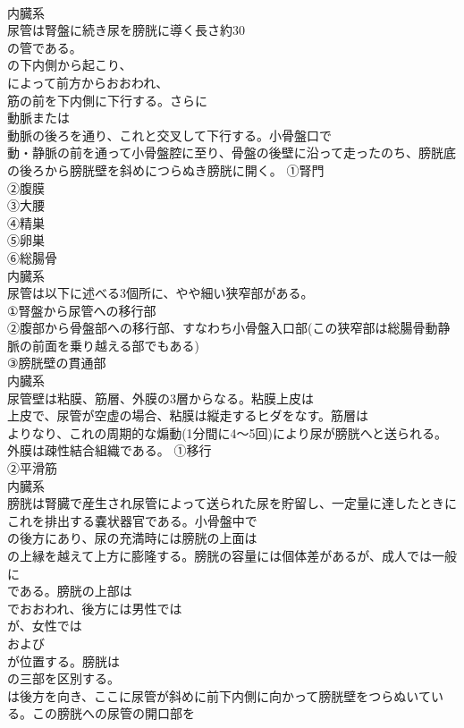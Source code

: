 \documentclass[8pt]{extreport}
\begin{document}
\begin{CJK}{UTF8}{min}
\\	内臓系
\\	尿管は腎盤に続き尿を膀胱に導く長さ約30
\\	の管である。
\\	の下内側から起こり、
\\	によって前方からおおわれ、
\\	筋の前を下内側に下行する。さらに
\\	動脈または
\\	動脈の後ろを通り、これと交叉して下行する。小骨盤口で
\\	動・静脈の前を通って小骨盤腔に至り、骨盤の後壁に沿って走ったのち、膀胱底の後ろから膀胱壁を斜めにつらぬき膀胱に開く。	①腎門
\\	②腹膜
\\	③大腰
\\	④精巣
\\	⑤卵巣
\\	⑥総腸骨
\\	内臓系
\\	尿管は以下に述べる3個所に、やや細い狭窄部がある。
\\	①腎盤から尿管への移行部
\\	②腹部から骨盤部への移行部、すなわち小骨盤入口部(この狭窄部は総腸骨動静脈の前面を乗り越える部でもある)
\\	③膀胱壁の貫通部
\\	内臓系
\\	尿管壁は粘膜、筋層、外膜の3層からなる。粘膜上皮は
\\	上皮で、尿管が空虚の場合、粘膜は縦走するヒダをなす。筋層は
\\	よりなり、これの周期的な煽動(1分間に4～5回)により尿が膀胱へと送られる。外膜は疎性結合組織である。	①移行
\\	②平滑筋
\\	内臓系
\\	膀胱は腎臓で産生され尿管によって送られた尿を貯留し、一定量に達したときにこれを排出する嚢状器官である。小骨盤中で
\\	の後方にあり、尿の充満時には膀胱の上面は
\\	の上縁を越えて上方に膨隆する。膀胱の容量には個体差があるが、成人では一般に
\\	である。膀胱の上部は
\\	でおおわれ、後方には男性では
\\	が、女性では
\\	および
\\	が位置する。膀胱は
\\	の三部を区別する。
\\	は後方を向き、ここに尿管が斜めに前下内側に向かって膀胱壁をつらぬいている。この膀胱への尿管の開口部を

\end{CJK}
\end{document}
